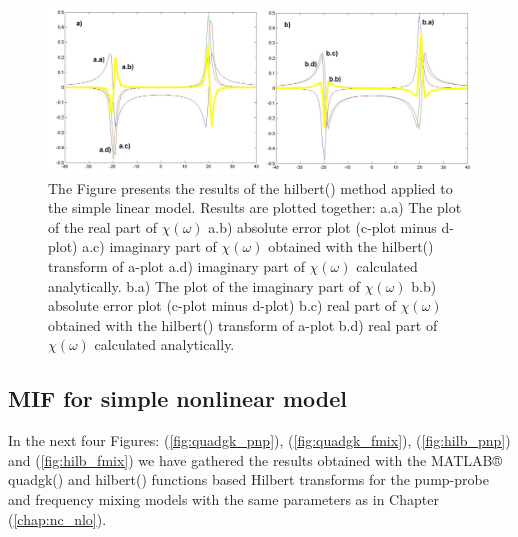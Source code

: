 \documentclass[12pt,twoside,a4paper]{article}
\numberwithin{equation}{subsection}
\numberwithin{figure}{subsection}
\begin{document}
\begin{figure} 
  \includegraphics[width=150mm]{img/hilb_lin.png}
  \caption{The Figure presents the results of the hilbert() method applied to the simple linear model. Results are plotted together:
   a.a) The plot of the real part of $\chi (\omega )$ 
   a.b) absolute error plot (c-plot minus d-plot) 
   a.c) imaginary part of $\chi (\omega )$ obtained with the hilbert() transform of a-plot 
   a.d) imaginary part of $\chi (\omega )$  calculated analytically. 
   b.a) The plot of the imaginary part of $\chi (\omega )$ 
   b.b) absolute error plot (c-plot minus d-plot) 
   b.c) real part of $\chi (\omega )$ obtained with the hilbert() transform of a-plot 
   b.d) real part of $\chi (\omega )$ calculated analytically. \label{fig:hilb_lin}
  }
\end{figure}

\subsection{MIF for simple nonlinear model} \label{chap:matlab_nlo}

In the next four Figures: (\ref{fig:quadgk_pnp}), (\ref{fig:quadgk_fmix}), (\ref{fig:hilb_pnp}) and (\ref{fig:hilb_fmix}) we have gathered
the results obtained with the MATLAB® quadgk() and hilbert() functions based Hilbert transforms for the pump-probe and frequency
mixing models with the same parameters as in Chapter (\ref{chap:nc_nlo}). 
\end{document}
